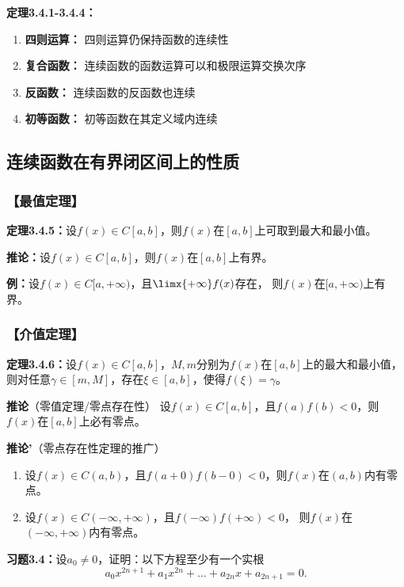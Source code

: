 {\bf 定理3.4.1-3.4.4：}
\begin{enumerate}[(1)]
  \setlength{\itemindent}{1cm}
  \item {\bf 四则运算：} 四则运算仍保持函数的连续性 
  \item {\bf 复合函数：} 连续函数的函数运算可以和极限运算交换次序 
  \item {\bf 反函数：} 连续函数的反函数也连续 
  \item {\bf 初等函数：} 初等函数在其定义域内连续
\end{enumerate}

\subsection{连续函数在有界闭区间上的性质}

\subsubsection{【最值定理】}

{\bf 定理3.4.5：}设$f(x)\in C[a,b]$，则$f(x)$在$[a,b]$上可取到最大和最小值。

{\bf 推论：}设$f(x)\in C[a,b]$，则$f(x)$在$[a,b]$上有界。

{\bf 例：}设$f(x)\in C[a,+\infty)$，且$\limx{+\infty}f(x)$存在，
则$f(x)$在$[a,+\infty)$上有界。

\subsubsection{【介值定理】}

{\bf 定理3.4.6：}设$f(x)\in C[a,b]$，$M,m$分别为$f(x)$在$[a,b]$上的最大和最小值，
则对任意$\gamma\in[m,M]$，存在$\xi\in[a,b]$，使得$f(\xi)=\gamma$。

{\bf 推论}（零值定理/零点存在性）
设$f(x)\in C[a,b]$，且$f(a)f(b)<0$，则$f(x)$在$[a,b]$上必有零点。

{\bf 推论'}（零点存在性定理的推广）
\begin{enumerate}[(1)]
  \setlength{\itemindent}{1cm}
  \item 设$f(x)\in C(a,b)$，且$f(a+0)f(b-0)<0$，则$f(x)$在$(a,b)$内有零点。 
  \item 设$f(x)\in C(-\infty,+\infty)$，且$f(-\infty)f(+\infty)<0$，
  则$f(x)$在$(-\infty,+\infty)$内有零点。
\end{enumerate}

{\bf 习题3.4：}设$a_0\ne 0$，证明：以下方程至少有一个实根
$$a_0x^{2n+1}+a_1x^{2n}+\ldots+a_{2n}x+a_{2n+1}=0.$$

